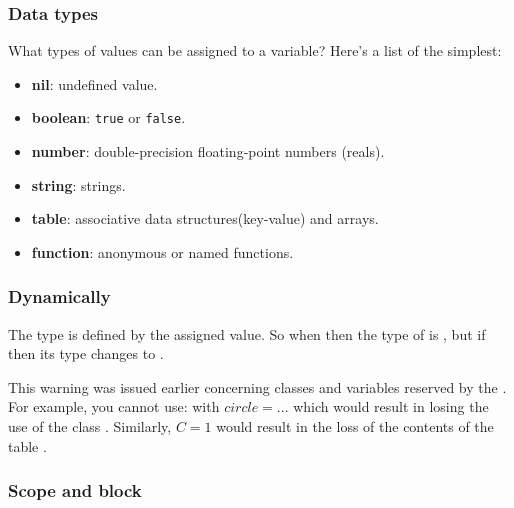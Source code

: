 \subsubsection{Data types}
\label{ssub:types}
 What types of values can be assigned to a variable? Here's a list of the simplest:

\begin{itemize}
    \item \textbf{nil}: undefined value.
    \item \textbf{boolean}: \texttt{true} or \texttt{false}.
    \item \textbf{number}: double-precision floating-point numbers (reals).
    \item \textbf{string}: strings.
    \item \textbf{table}: associative data structures(key-value) and arrays.
    \item \textbf{function}: anonymous or named functions.
\end{itemize}

\subsubsection{Dynamically}

The type is defined by the assigned value. So when  then the type of  is , but if  then its type changes to .

\tkzRHand This warning was issued earlier concerning classes and variables reserved by the . For example, you cannot use:  with $circle = ...$ which would result in losing the use of the class . Similarly, $C= 1$ would result in the loss of the contents of the table .

\subsubsection{Scope and block}

